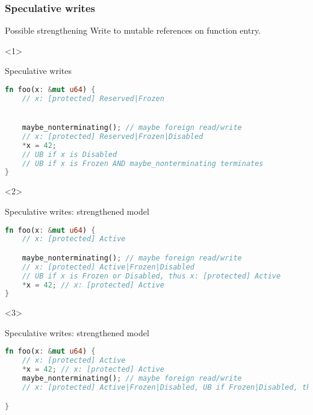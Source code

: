 \begin{frame}[fragile, t]
    \frametitle{Speculative writes}

    \begin{exampleblock}{Possible strengthening}
        Write to mutable references on function entry.
    \end{exampleblock}

    \begin{onlyenv}<1>
        \begin{block}{{\xmark} Speculative writes}
            \begin{lstlisting}[language=rust, basicstyle=\ttfamily\scriptsize]
fn foo(x: &mut u64) {
    // x: [protected] Reserved|Frozen


    maybe_nonterminating(); // maybe foreign read/write
    // x: [protected] Reserved|Frozen|Disabled
    *x = 42;
    // UB if x is Disabled
    // UB if x is Frozen AND maybe_nonterminating terminates
}
            \end{lstlisting}
        \end{block}
    \end{onlyenv}

    \begin{onlyenv}<2>
        \begin{block}{{\cmark} Speculative writes: strengthened model}
            \begin{lstlisting}[language=rust, basicstyle=\ttfamily\scriptsize]
fn foo(x: &mut u64) {
    // x: [protected] Active

    maybe_nonterminating(); // maybe foreign read/write
    // x: [protected] Active|Frozen|Disabled
    // UB if x is Frozen or Disabled, thus x: [protected] Active
    *x = 42; // x: [protected] Active
}
            \end{lstlisting}
        \end{block}
    \end{onlyenv}

    \begin{onlyenv}<3>
        \begin{block}{{\cmark} Speculative writes: strengthened model}
            \begin{lstlisting}[language=rust, basicstyle=\ttfamily\scriptsize]
fn foo(x: &mut u64) {
    // x: [protected] Active
    *x = 42; // x: [protected] Active
    maybe_nonterminating(); // maybe foreign read/write
    // x: [protected] Active|Frozen|Disabled, UB if Frozen|Disabled, thus x: [protected] Active

}
            \end{lstlisting}
        \end{block}
    \end{onlyenv}


\end{frame}
